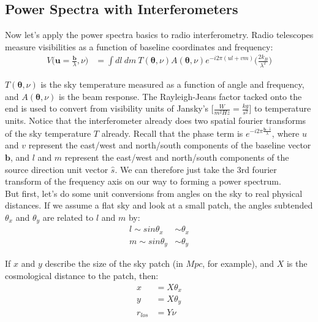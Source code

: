 \documentclass[12pt]{article}
\begin{document}
\subsection*{Power Spectra with Interferometers}

Now let's apply the power spectra basics to radio interferometry. Radio telescopes measure visibilities as a function of baseline coordinates and frequency:
\begin{align}
V\Big(\boldsymbol{u}={\frac{\boldsymbol{b}}{\lambda}},\nu \Big) &= \int dl \ dm \ T(\boldsymbol{\theta},\nu)A(\boldsymbol{\theta},\nu)e^{-i2\pi(ul+vm)}\Big({\frac{2k_{B}}{\lambda^{2}}}\Big)
\end{align}

\noindent $T(\boldsymbol{\theta},\nu)$ is the sky temperature measured as a function of angle and frequency, and $A(\boldsymbol{\theta},\nu)$ is the beam response. The Rayleigh-Jeans factor tacked onto the end is used to convert from visibility units of Jansky's $\Big[{\frac{W}{m^{2}Hz}} = {\frac{kg}{s^{2}}}\Big]$ to temperature units. Notice that the interferometer already does two spatial fourier transforms of the sky temperature $T$ already. Recall that the phase term is $e^{-i2\pi {\frac{\boldsymbol{b} \cdot \hat{s}}{\lambda}}}$, where $u$ and $v$ represent the east/west and north/south components of the baseline vector $\boldsymbol{b}$, and $l$ and $m$ represent the east/west and north/south components of the source direction unit vector $\hat{s}$. We can therefore just take the 3rd fourier transform of the frequency axis on our way to forming a power spectrum. \\

\noindent But first, let's do some unit conversions from angles on the sky to real physical distances. If we assume a flat sky and look at a small patch, the angles subtended $\theta_{x}$ and $\theta_{y}$ are related to $l$ and $m$ by:
\begin{align}
l \sim sin\theta_{x} &\sim \theta_{x} \\
m \sim sin\theta_{y} &\sim \theta_{y}
\end{align}

\noindent If $x$ and $y$ describe the size of the sky patch (in $Mpc$, for example), and $X$ is the cosmological distance to the patch, then:
\begin{align}
x &= X\theta_{x} \\
y &= X\theta_{y} \\
r_{los} &= Y\nu
\end{align}
\end{document}
